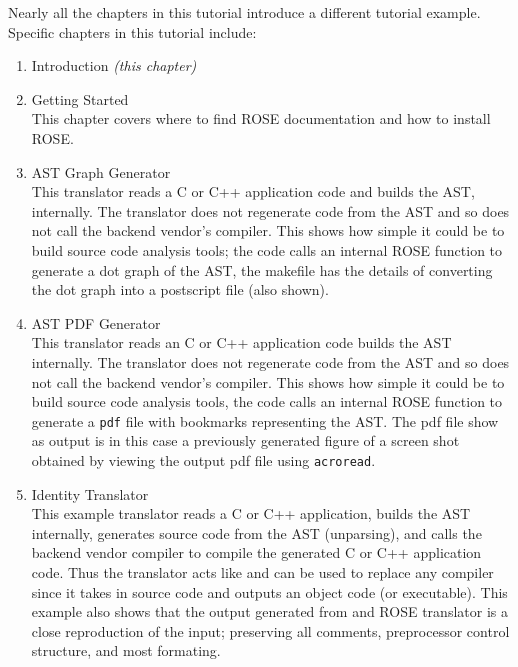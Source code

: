 Nearly all the chapters in this tutorial introduce a different tutorial example. 
Specific chapters in this tutorial include:
\begin{enumerate}
     \item Introduction {\em (this chapter)}
     \item Getting Started \\
           This chapter covers where to find ROSE documentation and how to install ROSE.
     \item AST Graph Generator \\
           This translator reads a C or C++ application code and builds the AST, internally.
           The translator does not regenerate code from the AST and so does not
           call the backend vendor's compiler. This shows how simple it could be
           to build source code analysis tools; the code calls an internal ROSE function
           to generate a dot graph of the AST, the makefile has the details of converting
           the dot graph into a postscript file (also shown).

     \item AST PDF Generator \\
           This translator reads an C or C++ application code builds the AST internally.
           The translator does not regenerate code from the AST and so does not
           call the backend vendor's compiler. This shows how simple it could be
           to build source code analysis tools, the code calls an internal ROSE function
           to generate a {\tt pdf} file with bookmarks representing the AST.  The 
           pdf file show as output is in this case a previously generated figure of a
           screen shot obtained by viewing the output pdf file using {\tt acroread}.

     \item Identity Translator \\
           This example translator reads a C or C++ application, builds the AST
           internally, generates source code from the AST (unparsing), and calls
           the backend vendor compiler to compile the generated C or C++ application 
           code.  Thus the translator acts like and can be used to replace any compiler 
           since it takes in source code and outputs an object code (or executable).
           This example also shows that the output generated from and ROSE translator is
           a close reproduction of the input; preserving all comments, preprocessor
           control structure, and most formating.


\end{enumerate}

